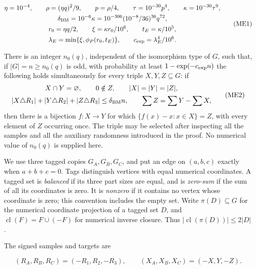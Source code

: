 \documentclass[11pt,a4paper]{article}
\begin{document}
\begin{equation}
\begin{gathered}
\eta=10^{-4},\qquad \rho=(\eta q)^2/9,\qquad p=\rho/4,\qquad
\tau=10^{-30}p^4,\qquad \kappa=10^{-30}\tau^9,\\
\delta_{\rm BM}=10^{-6}\kappa
 =10^{-306}(10^{-8}/36)^{36}q^{72},\\
r_0=\eta q/2,\qquad \xi=\kappa r_0/10^6,\qquad
t_E=\kappa/10^5,\\
\lambda_E=\min\{\xi,\phi_P(r_0,t_E)\},\qquad
c_{\rm exp}=\lambda_E^4/10^6.
\end{gathered}
\tag{ME1}\label{eq:ME1}
\end{equation}

There is an integer \(n_0(q)\), independent of the isomorphism type of \(G\), such that, if \(|G|=n\geq n_0(q)\) is odd, with probability at least \(1-\exp(-c_{\rm exp}n)\) the following holds simultaneously for every triple \(X,Y,Z\subseteq G\): if \begin{equation}
\begin{gathered}
X\cap Y=\varnothing,\qquad 0\notin Z,\qquad |X|=|Y|=|Z|,\\
|X\triangle R_1|+|Y\triangle R_2|+|Z\triangle R_3|
 \leq\delta_{\rm BM}n,\qquad
\sum Z=\sum Y-\sum X,
\end{gathered}
\tag{ME2}\label{eq:ME2}
\end{equation} then there is a bijection \(f:X\to Y\) for which \(\{f(x)-x:x\in X\}=Z\), with every element of \(Z\) occurring once. The triple may be selected after inspecting all the samples and all the auxiliary randomness introduced in the proof. No numerical value of \(n_0(q)\) is supplied here.

We use three tagged copies \(G_A,G_B,G_C\), and put an edge on \((a,b,c)\) exactly when \(a+b+c=0\). Tags distinguish vertices with equal numerical coordinates. A tagged set is \emph{balanced} if its three part sizes are equal, and is \emph{zero-sum} if the sum of all its coordinates is zero. It is \emph{nonzero} if it contains no vertex whose coordinate is zero; this convention includes the empty set. Write \(\pi(D)\subseteq G\) for the numerical coordinate projection of a tagged set \(D\), and \(\operatorname{cl}(F)=F\cup(-F)\) for numerical inverse closure. Thus \(|\operatorname{cl}(\pi(D))|\leq2|D|\).

The signed samples and targets are

\begin{equation}
(R_A,R_B,R_C)=(-R_1,R_2,-R_3),\qquad
(X_A,X_B,X_C)=(-X,Y,-Z).
\tag{ME3}\label{eq:ME3}
\end{equation}
\end{document}
